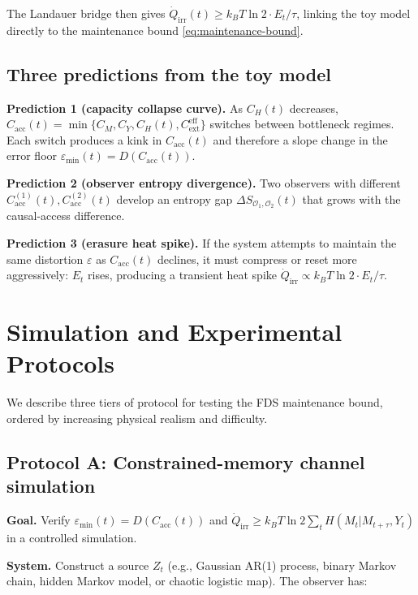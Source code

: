 \documentclass[10pt,a4paper,twocolumn,aps,prl]{revtex4-2}
\begin{document}
The Landauer bridge then gives $\dot Q_{\mathrm{irr}}(t)\geq k_BT\ln2\cdot E_t/\tau$, linking the toy model directly to the maintenance bound \eqref{eq:maintenance-bound}.

\subsection{Three predictions from the toy model}

\textbf{Prediction 1 (capacity collapse curve).} As $C_H(t)$ decreases, $C_{\mathrm{acc}}(t)=\min\{C_M,C_Y,C_H(t),C_{\mathrm{ext}}^{\mathrm{eff}}\}$ switches between bottleneck regimes. Each switch produces a kink in $C_{\mathrm{acc}}(t)$ and therefore a slope change in the error floor $\varepsilon_{\min}(t)=D(C_{\mathrm{acc}}(t))$.

\textbf{Prediction 2 (observer entropy divergence).} Two observers with different $C_{\mathrm{acc}}^{(1)}(t),C_{\mathrm{acc}}^{(2)}(t)$ develop an entropy gap $\Delta S_{\mathcal{O}_1,\mathcal{O}_2}(t)$ that grows with the causal-access difference.

\textbf{Prediction 3 (erasure heat spike).} If the system attempts to maintain the same distortion $\varepsilon$ as $C_{\mathrm{acc}}(t)$ declines, it must compress or reset more aggressively: $E_t$ rises, producing a transient heat spike $\dot Q_{\mathrm{irr}}\propto k_BT\ln2\cdot E_t/\tau$.

\section{Simulation and Experimental Protocols}

We describe three tiers of protocol for testing the FDS maintenance bound, ordered by increasing physical realism and difficulty.

\subsection{Protocol A: Constrained-memory channel simulation}

\textbf{Goal.} Verify $\varepsilon_{\min}(t)=D(C_{\mathrm{acc}}(t))$ and $\dot Q_{\mathrm{irr}}\geq k_BT\ln2\sum_t H(M_t|M_{t+\tau},Y_t)$ in a controlled simulation.

\textbf{System.} Construct a source $Z_t$ (e.g., Gaussian AR(1) process, binary Markov chain, hidden Markov model, or chaotic logistic map). The observer has:
\end{document}

